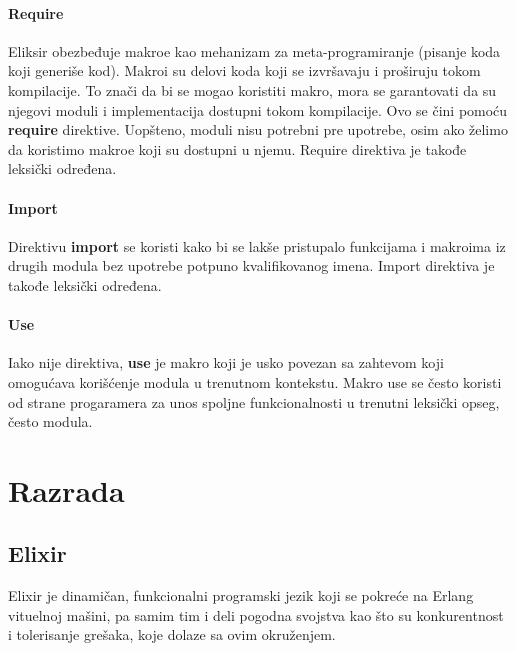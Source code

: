 \documentclass[12pt,oneside]{memoir}
\begin{document}
\subsubsection{Require}
Eliksir obezbeđuje makroe kao mehanizam za meta-programiranje (pisanje koda koji generiše kod). Makroi su delovi koda koji se izvršavaju i proširuju tokom kompilacije. To znači da bi se mogao koristiti makro, mora se garantovati da su njegovi moduli i implementacija dostupni tokom kompilacije. Ovo se čini pomoću \textbf{require} direktive. Uopšteno, moduli nisu potrebni pre upotrebe, osim ako želimo da koristimo makroe koji su dostupni u njemu. Require direktiva je takođe leksički određena.

\subsubsection{Import}
Direktivu \textbf{import} se koristi kako bi se lakše pristupalo funkcijama i makroima iz drugih modula bez upotrebe potpuno kvalifikovanog imena. Import direktiva je takođe leksički određena. 

\subsubsection{Use}
Iako nije direktiva, \textbf{use} je makro koji je usko povezan sa zahtevom koji omogućava korišćenje modula u trenutnom kontekstu. Makro use se često koristi od strane progaramera za unos spoljne funkcionalnosti u trenutni leksički opseg, često modula.

\chapter{Razrada}
\label{chp:razrada}

\section{Elixir}

Elixir je dinamičan, funkcionalni programski jezik koji se pokreće na Erlang vituelnoj mašini, pa samim tim i deli pogodna svojstva kao što su
konkurentnost i tolerisanje grešaka, koje dolaze sa ovim okruženjem.\cite{DefinicijaElixira}


\end{document}
